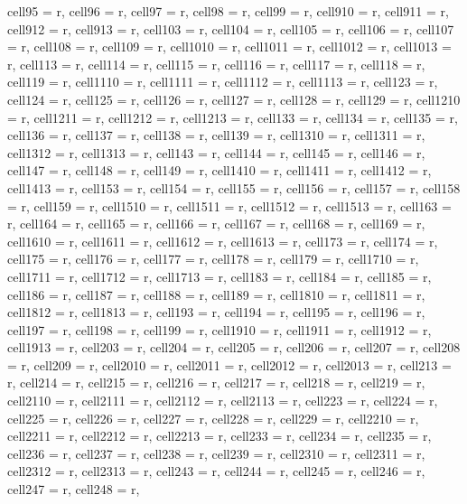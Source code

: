 \documentclass[journal]{IEEEtran}
\begin{document}
\begin{table}
\begin{adjustbox}{width=\textwidth}
\begin{tblr}
{  cell{9}{5} = {r}, cell{9}{6} = {r}, cell{9}{7} = {r}, cell{9}{8} = {r}, cell{9}{9} = {r}, cell{9}{10} = {r}, cell{9}{11} = {r}, cell{9}{12} = {r}, cell{9}{13} = {r}, cell{10}{3} = {r}, cell{10}{4} = {r}, cell{10}{5} = {r}, cell{10}{6} = {r}, cell{10}{7} = {r}, cell{10}{8} = {r}, cell{10}{9} = {r}, cell{10}{10} = {r}, cell{10}{11} = {r}, cell{10}{12} = {r}, cell{10}{13} = {r}, cell{11}{3} = {r}, cell{11}{4} = {r}, cell{11}{5} = {r}, cell{11}{6} = {r}, cell{11}{7} = {r}, cell{11}{8} = {r}, cell{11}{9} = {r}, cell{11}{10} = {r}, cell{11}{11} = {r}, cell{11}{12} = {r}, cell{11}{13} = {r}, cell{12}{3} = {r}, cell{12}{4} = {r}, cell{12}{5} = {r}, cell{12}{6} = {r}, cell{12}{7} = {r}, cell{12}{8} = {r}, cell{12}{9} = {r}, cell{12}{10} = {r}, cell{12}{11} = {r}, cell{12}{12} = {r}, cell{12}{13} = {r}, cell{13}{3} = {r}, cell{13}{4} = {r}, cell{13}{5} = {r}, cell{13}{6} = {r}, cell{13}{7} = {r}, cell{13}{8} = {r}, cell{13}{9} = {r}, cell{13}{10} = {r}, cell{13}{11} = {r}, cell{13}{12} = {r}, cell{13}{13} = {r}, cell{14}{3} = {r}, cell{14}{4} = {r}, cell{14}{5} = {r}, cell{14}{6} = {r}, cell{14}{7} = {r}, cell{14}{8} = {r}, cell{14}{9} = {r}, cell{14}{10} = {r}, cell{14}{11} = {r}, cell{14}{12} = {r}, cell{14}{13} = {r}, cell{15}{3} = {r}, cell{15}{4} = {r}, cell{15}{5} = {r}, cell{15}{6} = {r}, cell{15}{7} = {r}, cell{15}{8} = {r}, cell{15}{9} = {r}, cell{15}{10} = {r}, cell{15}{11} = {r}, cell{15}{12} = {r}, cell{15}{13} = {r}, cell{16}{3} = {r}, cell{16}{4} = {r}, cell{16}{5} = {r}, cell{16}{6} = {r}, cell{16}{7} = {r}, cell{16}{8} = {r}, cell{16}{9} = {r}, cell{16}{10} = {r}, cell{16}{11} = {r}, cell{16}{12} = {r}, cell{16}{13} = {r}, cell{17}{3} = {r}, cell{17}{4} = {r}, cell{17}{5} = {r}, cell{17}{6} = {r}, cell{17}{7} = {r}, cell{17}{8} = {r}, cell{17}{9} = {r}, cell{17}{10} = {r}, cell{17}{11} = {r}, cell{17}{12} = {r}, cell{17}{13} = {r}, cell{18}{3} = {r}, cell{18}{4} = {r}, cell{18}{5} = {r}, cell{18}{6} = {r}, cell{18}{7} = {r}, cell{18}{8} = {r}, cell{18}{9} = {r}, cell{18}{10} = {r}, cell{18}{11} = {r}, cell{18}{12} = {r}, cell{18}{13} = {r}, cell{19}{3} = {r}, cell{19}{4} = {r}, cell{19}{5} = {r}, cell{19}{6} = {r}, cell{19}{7} = {r}, cell{19}{8} = {r}, cell{19}{9} = {r}, cell{19}{10} = {r}, cell{19}{11} = {r}, cell{19}{12} = {r}, cell{19}{13} = {r}, cell{20}{3} = {r}, cell{20}{4} = {r}, cell{20}{5} = {r}, cell{20}{6} = {r}, cell{20}{7} = {r}, cell{20}{8} = {r}, cell{20}{9} = {r}, cell{20}{10} = {r}, cell{20}{11} = {r}, cell{20}{12} = {r}, cell{20}{13} = {r}, cell{21}{3} = {r}, cell{21}{4} = {r}, cell{21}{5} = {r}, cell{21}{6} = {r}, cell{21}{7} = {r}, cell{21}{8} = {r}, cell{21}{9} = {r}, cell{21}{10} = {r}, cell{21}{11} = {r}, cell{21}{12} = {r}, cell{21}{13} = {r}, cell{22}{3} = {r}, cell{22}{4} = {r}, cell{22}{5} = {r}, cell{22}{6} = {r}, cell{22}{7} = {r}, cell{22}{8} = {r}, cell{22}{9} = {r}, cell{22}{10} = {r}, cell{22}{11} = {r}, cell{22}{12} = {r}, cell{22}{13} = {r}, cell{23}{3} = {r}, cell{23}{4} = {r}, cell{23}{5} = {r}, cell{23}{6} = {r}, cell{23}{7} = {r}, cell{23}{8} = {r}, cell{23}{9} = {r}, cell{23}{10} = {r}, cell{23}{11} = {r}, cell{23}{12} = {r}, cell{23}{13} = {r}, cell{24}{3} = {r}, cell{24}{4} = {r}, cell{24}{5} = {r}, cell{24}{6} = {r}, cell{24}{7} = {r}, cell{24}{8} = {r}, }
\end{tblr}
\end{adjustbox}
\end{table}
\end{document}
